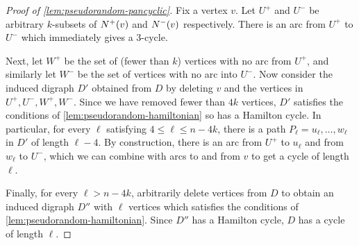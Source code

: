 \documentclass[11pt,english]{article}
\theoremstyle{plain}
\theoremstyle{definition}
\theoremstyle{definition}
\theoremstyle{plain}
\theoremstyle{plain}
\theoremstyle{plain}
\theoremstyle{plain}
\theoremstyle{remark}
\theoremstyle{remark}
\let\originalleft\left
\let\originalright\right
\renewcommand{\left}{\mathopen{}\mathclose\bgroup\originalleft}
\renewcommand{\right}{\aftergroup\egroup\originalright}
\begin{document}
\begin{proof}
[Proof of \ref{lem:pseudorandom-pancyclic}]Fix a vertex $v$. Let
$U^{+}$ and $U^{-}$ be arbitrary $k$-subsets of $N^{+}\left(v\right)$
and $N^{-}\left(v\right)$ respectively. There is an arc from $U^{+}$
to $U^{-}$ which immediately gives a 3-cycle.

Next, let $W^{+}$ be the set of (fewer than $k$) vertices with no
arc from $U^{+}$, and similarly let $W^{-}$ be the set of vertices
with no arc into $U^{-}$. Now consider the induced digraph $D'$
obtained from $D$ by deleting $v$ and the vertices in $U^{+},U^{-},W^{+},W^{-}$.
Since we have removed fewer than $4k$ vertices, $D'$ satisfies the
conditions of \ref{lem:pseudorandom-hamiltonian} so has a Hamilton
cycle. In particular, for every $\ell$ satisfying $4\le\ell\le n-4k$,
there is a path $P_{\ell}=u_{\ell},\dots, w_{\ell}$ in $D'$ of length
$\ell-4$. By construction, there is an arc from $U^{+}$ to $u_{\ell}$
and from $w_{\ell}$ to $U^{-}$, which we can combine with arcs to
and from $v$ to get a cycle of length $\ell$.

Finally, for every $\ell>n-4k$, arbitrarily delete vertices from
$D$ to obtain an induced digraph $D''$ with $\ell$ vertices which
satisfies the conditions of \ref{lem:pseudorandom-hamiltonian}. Since
$D''$ has a Hamilton cycle, $D$ has a cycle of length $\ell$.
\end{proof}
\end{document}
